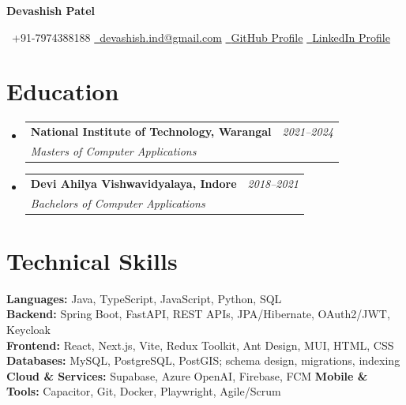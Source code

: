 \documentclass[a4paper,11pt]{article}
\makeatletter
\newcommand{\resumeSubheading}[4]{
\vspace{0.5mm}\item
\begin{tabular*}{0.98\textwidth}[t]{l@{\extracolsep{\fill}}r}
    \textbf{#1} & \textit{\footnotesize{#4}} \\
    \textit{\footnotesize{#3}} &  \footnotesize{#2}\\
\end{tabular*}
\vspace{-2.4mm}
}
\newcommand{\resumeSubHeadingListStart}{\begin{itemize}[leftmargin=*,labelsep=0mm]}
\newcommand{\resumeSubHeadingListEnd}{\end{itemize}\vspace{2mm}}
\newcommand{\name}{Devashish Patel}
\newcommand{\phone}{7974388188}
\newcommand{\emaila}{devashish.ind@gmail.com}
\newcommand{\github}{https://github.com/Devashish-01}
\newcommand{\linkedin}{https://www.linkedin.com/in/devashish-patel01/}
\makeatother
\begin{document}
\selectfont

\begin{center}
\fontsize{20}{20}\selectfont
\textbf{\name}
\end{center}

\begin{center}
{\raisebox{0.0\height}{\footnotesize \faPhone}\ +91-\phone} \quad
\href{mailto:\emaila}{\raisebox{0.0\height}{\footnotesize \faEnvelope}\ \emaila} \quad
\href{\github}{\raisebox{0.0\height}{\footnotesize \faGithub}\ {GitHub Profile}} \quad
\href{\linkedin}{\raisebox{0.0\height}{\footnotesize \faLinkedin}\ {LinkedIn Profile}}
\end{center}

\vspace{-2.0mm}

\section{\textbf{Education}}
\resumeSubHeadingListStart
\resumeSubheading
  { National Institute of Technology, Warangal}{}
  {Masters of Computer Applications}{2021--2024}
\resumeSubheading
  { Devi Ahilya Vishwavidyalaya, Indore}{}
  {Bachelors of Computer Applications}{2018--2021}
\resumeSubHeadingListEnd
\vspace{-3.0mm}

\section{\textbf{Technical Skills}}
\vspace{0.5mm}
\begin{itemize}[leftmargin=0.05in, label={}]
\small{\item{
    \textbf{Languages:} Java, TypeScript, JavaScript, Python, SQL \\
    \textbf{Backend:} Spring Boot, FastAPI, REST APIs, JPA/Hibernate, OAuth2/JWT, Keycloak \\
    \textbf{Frontend:} React, Next.js, Vite, Redux Toolkit, Ant Design, MUI, HTML, CSS \\
    \textbf{Databases:} MySQL, PostgreSQL, PostGIS; schema design, migrations, indexing \\
    \textbf{Cloud \& Services:} Supabase, Azure OpenAI, Firebase, FCM \quad \textbf{Mobile \& Tools:} Capacitor, Git, Docker, Playwright, Agile/Scrum
}}
\end{itemize}

\end{document}
